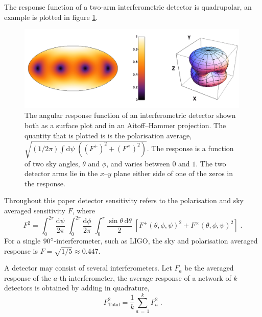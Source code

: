 The response function of a two-arm interferometric detector is quadrupolar, an example is plotted in figure \ref{fig:LIGO}.
\begin{figure}
 \centering
 \includegraphics[trim=0cm 0cm 0cm 0cm, width=0.99\textwidth]{LIGO_detectorframe.pdf}
 \caption{The angular response function of an interferometric detector shown both as a surface plot and in an Aitoff--Hammer projection. The quantity that is plotted is is the polarisation average, $\sqrt{(1/2\pi)\int\textrm{d}\psi \;((F^{+})^{2}+(F^{\times})^{2})}$. The response is a function of two sky angles, $\theta$ and $\phi$, and varies between $0$ and $1$. The two detector arms lie in the $x$--$y$ plane either side of one of the zeros in the response.}
 \label{fig:LIGO}
\end{figure}
Throughout this paper detector sensitivity refers to the polarisation and sky averaged sensitivity $F$, where
\begin{equation}\label{eq:skyav}
F^{2}=\int_{0}^{2\pi}\frac{\mathrm{d}\psi}{2\pi}\; \int_{0}^{2\pi} \frac{\mathrm{d}\phi}{2\pi}\; \int_{0}^{\pi}\frac{\sin\theta\,\mathrm{d}\theta}{2}\;\left[F^{+}\left(\theta,\phi,\psi\right)^{2}+F^{\times}\left(\theta,\phi,\psi\right)^{2}\right]\; .
\end{equation}
For a single $90^\circ$-interferometer, such as LIGO, the sky and polarisation averaged response is $F=\sqrt{1/5}\approx 0.447$.

A detector may consist of several interferometers. Let $F_{a}$ be the averaged response of the $a$-th interferometer, the average response of a network of $k$ detectors is obtained by adding in quadrature,
\begin{equation} F_{\mathrm{Total}}^{2}=\frac{1}{k}\sum_{a\,=\,1}^{k}F_{a}^{2} \; .\end{equation}

